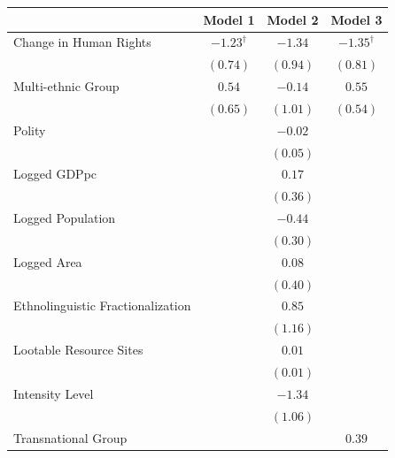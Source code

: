 \documentclass[12pt,]{book}
\let\origtable\table
\let\endorigtable\endtable
\renewenvironment{table}[1][2] {
    \singlespacing
    \expandafter\origtable\expandafter[H]
} {
    \endorigtable
}
\theoremstyle{definition}
\theoremstyle{definition}
\theoremstyle{remark}
\begin{document}
\begin{table}
\begin{center}
\begin{tabular}{l c c c }
\hline
 & Model 1 & Model 2 & Model 3 \\
\hline
Change in Human Rights            & $-1.23^{\dagger}$ & $-1.34$  & $-1.35^{\dagger}$ \\
                                  & $(0.74)$          & $(0.94)$ & $(0.81)$          \\
Multi-ethnic Group                & $0.54$            & $-0.14$  & $0.55$            \\
                                  & $(0.65)$          & $(1.01)$ & $(0.54)$          \\
Polity                            &                   & $-0.02$  &                   \\
                                  &                   & $(0.05)$ &                   \\
Logged GDPpc                      &                   & $0.17$   &                   \\
                                  &                   & $(0.36)$ &                   \\
Logged Population                 &                   & $-0.44$  &                   \\
                                  &                   & $(0.30)$ &                   \\
Logged Area                       &                   & $0.08$   &                   \\
                                  &                   & $(0.40)$ &                   \\
Ethnolinguistic Fractionalization &                   & $0.85$   &                   \\
                                  &                   & $(1.16)$ &                   \\
Lootable Resource Sites           &                   & $0.01$   &                   \\
                                  &                   & $(0.01)$ &                   \\
Intensity Level                   &                   & $-1.34$  &                   \\
                                  &                   & $(1.06)$ &                   \\
Transnational Group               &                   &          & $0.39$            \\

\end{tabular}
\end{center}
\end{table}
\end{document}
